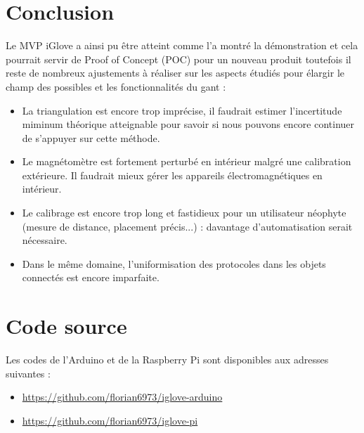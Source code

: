 \documentclass{article}
\begin{document}
    \section{Conclusion}

            Le MVP iGlove a ainsi pu être atteint comme l'a montré la démonstration et cela pourrait servir de Proof of Concept (POC) pour un nouveau produit
             toutefois il reste de nombreux ajustements à réaliser sur les aspects étudiés pour élargir le champ des possibles et les fonctionnalités du gant :
             \begin{itemize}
                \item La triangulation est encore trop imprécise, il faudrait estimer l'incertitude miminum théorique atteignable 
                        pour savoir si nous pouvons encore continuer de s'appuyer sur cette méthode.
                \item Le magnétomètre est fortement perturbé en intérieur malgré une calibration extérieure.
                        Il faudrait mieux gérer les appareils électromagnétiques en intérieur.
                \item Le calibrage est encore trop long et fastidieux pour un utilisateur néophyte (mesure de distance, placement précis...) :
                        davantage d'automatisation serait nécessaire.
                \item Dans le même domaine, l'uniformisation des protocoles dans les objets connectés est encore imparfaite.
             \end{itemize}


    \appendix

    \section {Code source}
        Les codes de l'Arduino et de la Raspberry Pi sont disponibles aux adresses suivantes :
        \begin{itemize}
            \item \url{https://github.com/florian6973/iglove-arduino}
            \item \url{https://github.com/florian6973/iglove-pi}
        \end{itemize}
\end{document}
